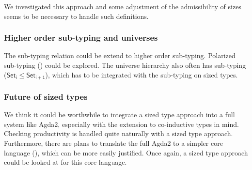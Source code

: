 We investigated this approach and some adjustment of the admissibility of sizes seems to be necessary to handle such definitions.
\subsubsection{Higher order sub-typing and universes }
The sub-typing relation could be extend to higher order sub-typing.
Polarized sub-typing (\cite{steffen:phd}) could be explored.
The universe hierarchy also often has sub-typing ($ \mathsf{Set_i} \leq \mathsf{Set_{i+1}}$), which has to be integrated with the sub-typing on sized types.
\subsubsection{Future of sized types}
We think it could be worthwhile to integrate a sized type approach into a full system like Agda2, especially with the extension to co-inductive types in mind. Checking productivity is handled quite naturally with a sized type approach. 
Furthermore, there are plans to translate the full Agda2 to a simpler core language (\cite{mini-tt}), which can be more easily justified. Once again, a sized type approach could be looked at for this core language.

